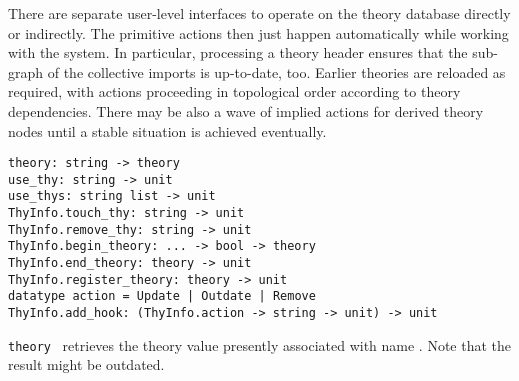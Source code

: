 \begin{isabellebody}
\begin{isamarkuptext}
  \medskip There are separate user-level interfaces to operate on the
  theory database directly or indirectly.  The primitive actions then
  just happen automatically while working with the system.  In
  particular, processing a theory header  ensures that the
  sub-graph of the collective imports 
  is up-to-date, too.  Earlier theories are reloaded as required, with
   actions proceeding in topological order according to
  theory dependencies.  There may be also a wave of implied  actions for derived theory nodes until a stable situation
  is achieved eventually.%
\end{isamarkuptext}%
\isamarkuptrue%
%
\isadelimmlref
%
\endisadelimmlref
%
\isatagmlref
%
\begin{isamarkuptext}%
\begin{mldecls}
  \verb|theory: string -> theory| \\
  \verb|use_thy: string -> unit| \\
  \verb|use_thys: string list -> unit| \\
  \verb|ThyInfo.touch_thy: string -> unit| \\
  \verb|ThyInfo.remove_thy: string -> unit| \\[1ex]
  \verb|ThyInfo.begin_theory|\verb|: ... -> bool -> theory| \\
  \verb|ThyInfo.end_theory: theory -> unit| \\
  \verb|ThyInfo.register_theory: theory -> unit| \\[1ex]
  \verb|datatype action = Update |\verb,|,\verb| Outdate |\verb,|,\verb| Remove| \\
  \verb|ThyInfo.add_hook: (ThyInfo.action -> string -> unit) -> unit| \\
  \end{mldecls}

  \begin{description}

  \item \verb|theory|~ retrieves the theory value presently
  associated with name .  Note that the result might be
  outdated.


\end{description}
\end{isamarkuptext}
\end{isabellebody}
